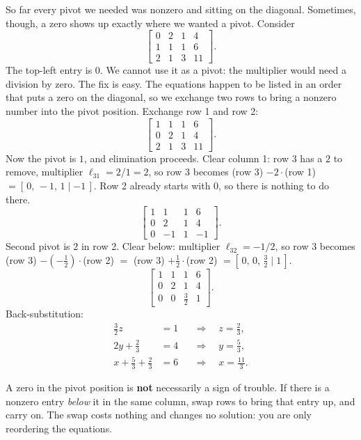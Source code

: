 So far every pivot we needed was nonzero and sitting on the
diagonal. Sometimes, though, a zero shows up exactly where
we wanted a pivot. Consider
\[
\left[\begin{array}{ccc|c}
0 & 2 & 1 & 4\\
1 & 1 & 1 & 6\\
2 & 1 & 3 & 11
\end{array}\right].
\]
The top-left entry is $0$. We cannot use it as a pivot: the multiplier would
need a division by zero. The fix is easy. The equations happen to be
listed in an order that puts a zero on the diagonal, so we exchange
two rows to bring a nonzero number into the pivot position. Exchange
row 1 and row 2:
\[
\left[\begin{array}{ccc|c}
1 & 1 & 1 & 6\\
0 & 2 & 1 & 4\\
2 & 1 & 3 & 11
\end{array}\right].
\]
Now the pivot is $1$, and elimination proceeds. Clear column 1: row 3
has a $2$ to remove, multiplier $\ell_{31}=2/1=2$, so row 3 becomes (row 3)
$-2\cdot$(row 1) $= [\,0,\,-1,\,1\mid -1\,]$. Row 2 already starts with $0$, so
there is nothing to do there.
\[
\left[\begin{array}{ccc|c}
1 & 1 & 1 & 6\\
0 & 2 & 1 & 4\\
0 & -1 & 1 & -1
\end{array}\right].
\]
Second pivot is $2$ in row 2. Clear below: multiplier $\ell_{32}=-1/2$, so row 3
becomes (row 3) $-(-\tfrac12)\cdot$(row 2) $=$ (row 3) $+\tfrac12\cdot$(row 2)
$= [\,0,\,0,\,\tfrac32\mid 1\,]$.
\[
\left[\begin{array}{ccc|c}
1 & 1 & 1 & 6\\
0 & 2 & 1 & 4\\
0 & 0 & \tfrac32 & 1
\end{array}\right].
\]
Back-substitution:
\begin{align*}
\tfrac32 z &= 1 &&\Longrightarrow\quad z = \tfrac23,\\
2y + \tfrac23 &= 4 &&\Longrightarrow\quad y = \tfrac53,\\
x + \tfrac53 + \tfrac23 &= 6 &&\Longrightarrow\quad x = \tfrac{11}{3}.
\end{align*}

\begin{focusbox}
A zero in the pivot position is \textbf{not} necessarily a sign of trouble. If
there is a nonzero entry \emph{below} it in the same column, swap rows to
bring that entry up, and carry on. The swap costs nothing and changes no
solution: you are only reordering the equations.
\end{focusbox}

